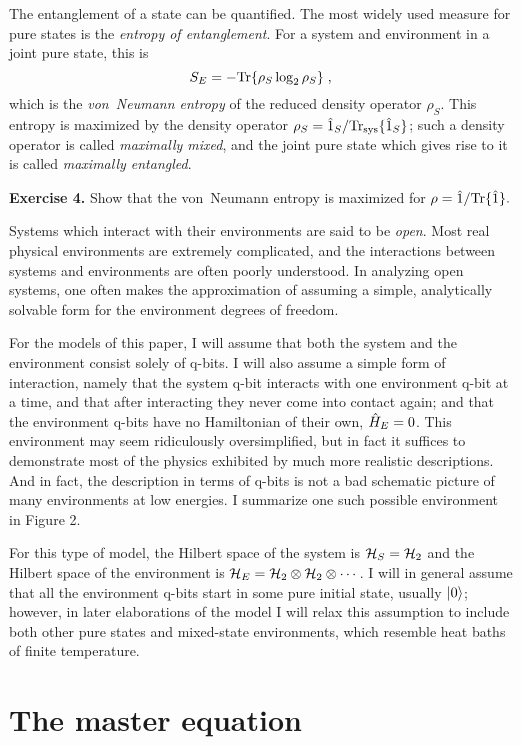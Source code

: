 The entanglement of a state can be quantified.  The most widely used
measure for pure states is the {\it entropy of entanglement}.
For a system and environment in a joint pure state, this is
\begin{equation}
S_E = - {\rm Tr}\{\rho_S \log_2 \rho_S \} \;,
\end{equation}
which is the {\it von~Neumann entropy} of the reduced density operator
$\rho_S$.  This entropy is maximized by the density operator
$\rho_S = {\hat 1}_S/{\rm Tr}_{\rm sys}\{{\hat 1}_S\}$; such a density operator
is called {\it maximally mixed},
and the joint pure state which gives rise to it is called
{\it maximally entangled}.

\medskip\noindent
{\bf Exercise 4.}  Show that the von~Neumann entropy is maximized for
$\rho = {\hat 1}/{\rm Tr}\{{\hat 1}\}.$
\medskip

Systems which interact with their environments are said to be {\it open}.
Most real physical environments are extremely complicated, and the
interactions between systems and environments are often poorly understood.
In analyzing open systems, one often makes the approximation of assuming
a simple, analytically solvable form for the environment degrees of
freedom.

For the models of this paper, I will assume that both the system and
the environment consist solely of q-bits.  I will also assume a simple
form of interaction, namely that the system q-bit interacts with one
environment q-bit at a time, and that after interacting they never come
into contact again; and that the environment q-bits have no Hamiltonian
of their own, ${\hat H}_E=0$.  This environment may seem
ridiculously oversimplified, but in fact it suffices to demonstrate most
of the physics exhibited by much more realistic descriptions.  And in
fact, the description in terms of q-bits is not a bad schematic picture
of many environments at low energies.  I summarize one such
possible environment in Figure 2.

For this type of model, the Hilbert space of the system is
${\cal H}_S = {\cal H}_2$ and the Hilbert space of the environment
is ${\cal H}_E = {\cal H}_2 \otimes {\cal H}_2 \otimes \cdots$.
I will in general assume that all the environment q-bits start in some
pure initial state, usually ${| 0 \rangle}$; however, in later elaborations of
the model I will relax this assumption to include
both other pure states and mixed-state environments,
which resemble heat baths of finite temperature.


\section{The master equation}

